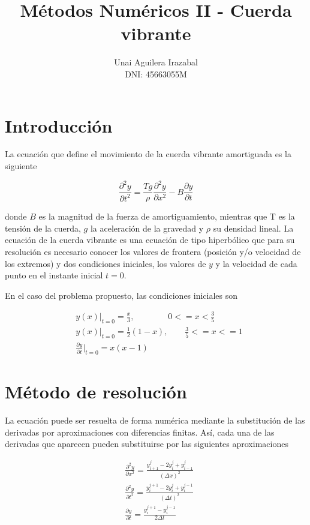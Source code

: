 \documentclass[11pt]{article}
\title{Métodos Numéricos II - Cuerda vibrante}
\author{Unai Aguilera Irazabal\\ DNI: 45663055M}
\begin{document}
\maketitle
\tableofcontents

\section{Introducción}
La ecuación que define el movimiento de la cuerda vibrante amortiguada es la siguiente

\begin{equation}
\frac{\partial^2 y}{\partial{t^2}} = \frac{Tg}{\rho}\frac{\partial^2 y}{\partial{x^2}} 
	- B\frac{\partial y}{\partial{t}}
\label{eq:cuerda}
\end{equation}

donde $B$ es la magnitud de la fuerza de amortiguamiento, mientras que T es la tensión de
la cuerda, $g$ la aceleración de la gravedad y $\rho$ su densidad lineal. 
La ecuación de la cuerda vibrante es una ecuación de tipo hiperbólico que para su resolución
es necesario conocer los valores de frontera (posición y/o velocidad de los extremos) y
dos condiciones iniciales, los valores de $y$ y la velocidad de cada punto en el instante
inicial $t=0$.

En el caso del problema propuesto, las condiciones iniciales son

\begin{subequations}
\begin{flalign}
	&y(x)|_{t=0} = \frac{x}{3},~~~~~~~~~~~~~~~~~~ 0 <= x < \frac{3}{5}\\
	&y(x)|_{t=0} = \frac{1}{2}(1 - x),~~~~~~~~~ \frac{3}{5} <= x <= 1\\
	&\frac{\partial{y}}{\partial{t}}|_{t=0} = x(x-1)
\end{flalign}
\label{eq:condiciones_iniciales}
\end{subequations}

\section{Método de resolución}
La ecuación puede ser resuelta de forma numérica mediante la substitución de las derivadas
por aproximaciones con diferencias finitas. Así, cada una de las derivadas que aparecen
pueden substituirse por las siguientes aproximaciones

\begin{subequations}
\begin{flalign}
	&\frac{\partial^2 y}{\partial{x^2}} = \frac{y^j_{i+1} - 2y^j_i + y^j_{i-1}}{(\Delta{x})^2}\\
	&\frac{\partial^2 y}{\partial{t^2}} = \frac{y^{j+1}_i - 2y^j_i + y^{j-1}_i}{(\Delta{t})^2}\\
	&\frac{\partial{y}}{\partial{t}} = \frac{y^{j+1}_i - y^{j-1}_i}{2\Delta{t}}
\end{flalign}
\end{subequations}
\end{document}
